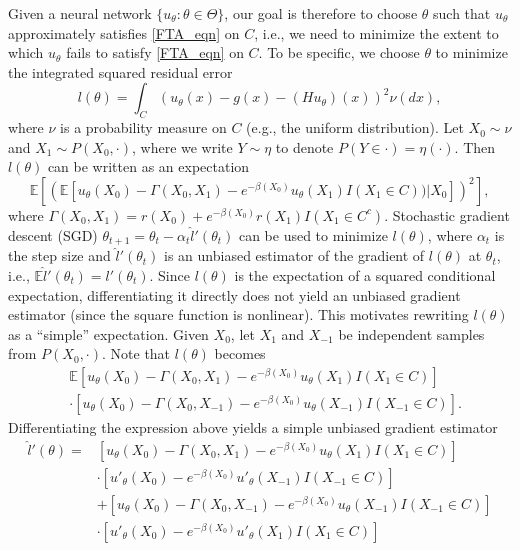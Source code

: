 \documentclass[pdflatex,sn-mathphys-ay]{sn-jnl}%
\numberwithin{equation}{section}
\newcommand\prs[1]{\left(#1\right)}
\newcommand\sbk[1]{\left[#1\right]}
\newcommand{\E}{\mathbb{E}}
\theoremstyle{thmstyleone}%
\theoremstyle{thmstyletwo}%
\theoremstyle{thmstylethree}%
\begin{document}
Given a neural network $\{u_\theta:\theta\in\Theta\}$, our goal is therefore to choose $\theta$ such that $u_\theta$ approximately satisfies \eqref{FTA_eqn} on $C$, i.e., we need to minimize the extent to which $u_\theta$ fails to satisfy \eqref{FTA_eqn} on $C$. To be specific, we choose $\theta$ to minimize the integrated squared residual error
\[
l(\theta)=\int_C\prs{u_\theta(x)-g(x)-(Hu_\theta)(x)}^2\nu(dx),
\]
where $\nu$ is a probability measure on $C$ (e.g., the uniform distribution).
Let $X_0\sim\nu$ and $X_1\sim P(X_0,\cdot)$, where we write $Y\sim\eta$ to denote $P(Y\in\cdot)=\eta(\cdot)$. Then $l(\theta)$ can be written as an expectation
\[
\E\sbk{\prs{\E\sbk{u_\theta(X_0)-\Gamma(X_0,X_1)-e^{-\beta(X_0)}u_\theta(X_1)I(X_1\in C))\Big|X_0}}^2},
\]
where $\Gamma(X_0,X_1)=r(X_0)+e^{-\beta(X_0)}r(X_1)I(X_1\in C^c)$.
Stochastic gradient descent (SGD) $\theta_{t+1}=\theta_t-\alpha_t\hat{l}'(\theta_t)$ \citep{robbins1951stochastic} can be used to minimize $l(\theta)$, where $\alpha_t$ is the step size and $\hat{l}'(\theta_t)$ is an unbiased estimator of the gradient of $l(\theta)$ at $\theta_t$, i.e., $\E\hat{l}'(\theta_t)=l'(\theta_t)$. Since $l(\theta)$ is the expectation of a squared conditional expectation, differentiating it directly does not yield an unbiased gradient estimator (since the square function is nonlinear). This motivates rewriting $l(\theta)$ as a ``simple'' expectation. Given $X_0$, let $X_1$ and $X_{-1}$ be independent samples from $P(X_0,\cdot)$. Note that $l(\theta)$ becomes
\begin{equation}
\label{trick_eqn}
\begin{aligned}
&\E\sbk{u_\theta(X_0)-\Gamma(X_0,X_1)-e^{-\beta(X_0)}u_\theta(X_1)I(X_1\in C)}\\
&\cdot\sbk{u_\theta(X_0)-\Gamma(X_0,X_{-1})-e^{-\beta(X_0)}u_\theta(X_{-1})I(X_{-1}\in C)}.
\end{aligned}
\end{equation}
Differentiating the expression above yields a simple unbiased gradient estimator
\begin{equation}
\label{gradient_eqn}
\begin{aligned}
\hat{l}'(\theta)=&\sbk{u_\theta(X_0)-\Gamma(X_0,X_1)-e^{-\beta(X_0)}u_\theta(X_1)I(X_1\in C)}\\
&\cdot\sbk{u'_\theta(X_0)-e^{-\beta(X_0)}u'_\theta(X_{-1})I(X_{-1}\in C)}\\
&+\sbk{u_\theta(X_0)-\Gamma(X_0,X_{-1})-e^{-\beta(X_0)}u_\theta(X_{-1})I(X_{-1}\in C)}\\
&\cdot\sbk{u'_\theta(X_0)-e^{-\beta(X_0)}u'_\theta(X_1)I(X_1\in C)}
\end{aligned}
\end{equation}
\end{document}
